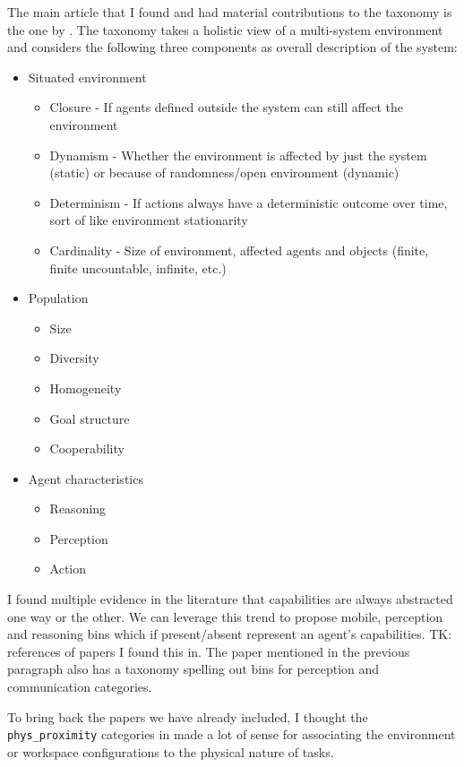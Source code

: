 \documentclass[letterpaper, 10 pt, conference]{ieeeconf} %
\begin{document}
The main article that I found and had material contributions to the taxonomy is the one by
\citet{moya2007towards}. The taxonomy takes a holistic view of a multi-system environment and
considers the following three components as overall description of the system:
\begin{itemize}{}
  \item Situated environment
    \begin{itemize}{}
      \item Closure - If agents defined outside the system can still affect the environment
      \item Dynamism - Whether the environment is affected by just the system (static) or because of
        randomness/open environment (dynamic)
      \item Determinism - If actions always have a deterministic outcome over time, sort of like
        environment stationarity
      \item Cardinality - Size of environment, affected agents and objects (finite, finite
        uncountable, infinite, etc.)
    \end{itemize}
  \item Population
    \begin{itemize}{}
      \item Size
      \item Diversity
      \item Homogeneity
      \item Goal structure
      \item Cooperability
    \end{itemize}
  \item Agent characteristics
    \begin{itemize}{}
      \item Reasoning
      \item Perception
      \item Action
    \end{itemize}
\end{itemize}

I found multiple evidence in the literature that capabilities are always abstracted one way or the
other. We can leverage this trend to propose mobile, perception and reasoning bins which if
present/absent represent an agent's capabilities. TK: references of papers I found this in. The
paper mentioned in the previous paragraph also has a taxonomy spelling out bins for perception and
communication categories.

To bring back the papers we have already included, I thought the \texttt{phys\_proximity} categories
in \citet{Yanco2004updated} made a lot of sense for associating the environment or workspace
configurations to the physical nature of tasks.
\end{document}
